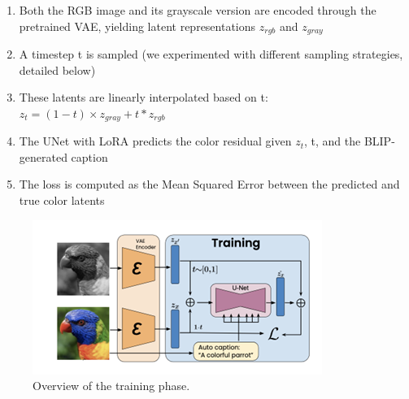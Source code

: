 \documentclass[10pt,twocolumn,letterpaper]{article}
\begin{document}
\begin{enumerate}
\item Both the RGB image and its grayscale version are encoded through the pretrained VAE, yielding latent representations $\mathit{z_{rgb}}$ and $\mathit{z_{gray}}$
\item A timestep t is sampled (we experimented with different sampling strategies, detailed below)
\item These latents are linearly interpolated based on t: \begin{math}z_t = (1-t) × z_{gray} + t * z_{rgb} \end{math}
\item The UNet with LoRA predicts the color residual given \begin{math}z_t \end{math}, t, and the BLIP-generated caption
\item The loss is computed as the Mean Squared Error between the predicted and true color latents
\end{enumerate}

\begin{figure}[t]
    \centering
    \includegraphics[width=0.8\linewidth]{TrainingAndInference.png}
    \caption{Overview of the training phase.}
    \label{fig:training}
\end{figure}
\end{document}
